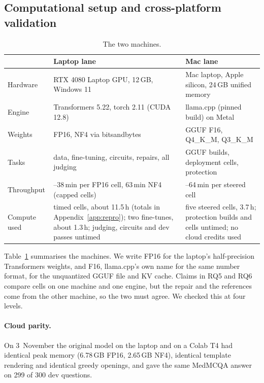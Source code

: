 \subsection{Computational setup and cross-platform validation}\label{sec:compute}

\begin{table}[tbp]
\centering
\caption{The two machines.}\label{tab:machines}
\footnotesize
\begin{tabular}{>{\raggedright\arraybackslash}p{2.0cm}>{\raggedright\arraybackslash}p{4.7cm}>{\raggedright\arraybackslash}p{4.7cm}}
\toprule
& Laptop lane & Mac lane \\
\midrule
Hardware & RTX 4080 Laptop GPU, 12\,GB, Windows 11 & Mac laptop, Apple silicon, 24\,GB unified memory \\
Engine & Transformers 5.22, torch 2.11 (CUDA 12.8) & llama.cpp (pinned build) on Metal \\
Weights & FP16, NF4 via bitsandbytes & GGUF F16, Q4\_K\_M, Q3\_K\_M \\
Tasks & data, fine-tuning, circuits, repairs, all judging & GGUF builds, deployment cells, protection \\
Throughput & 34--38\,min per FP16 cell, 63\,min NF4 (capped cells) & 35--64\,min per steered cell \\
Compute used & 48 timed cells, about 11.5\,h (totals in Appendix~\ref{app:repro}); two fine-tunes, about 1.3\,h; judging, circuits and dev passes untimed & five steered cells, 3.7\,h; protection builds and cells untimed; no cloud credits used \\
\bottomrule
\end{tabular}
\end{table}

Table~\ref{tab:machines} summarises the machines. We write FP16 for the laptop's half-precision Transformers weights, and F16, llama.cpp's own name for the same number format, for the unquantized GGUF file and KV cache. Claims in RQ5 and RQ6 compare cells on one machine and one engine, but the repair and the references come from the other machine, so the two must agree. We checked this at four levels.

\paragraph{Cloud parity.} On 3~November the original model on the laptop and on a Colab T4 had identical peak memory (6.78\,GB FP16, 2.65\,GB NF4), identical template rendering and identical greedy openings, and gave the same MedMCQA answer on 299 of 300 dev questions.

